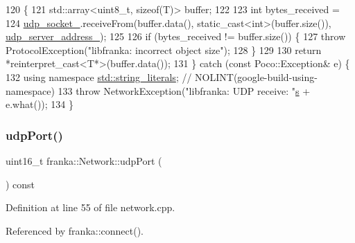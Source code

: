 \begin{DoxyCode}
120                                         \{
121   std::array<uint8\_t, sizeof(T)> buffer;
122 
123   \textcolor{keywordtype}{int} bytes\_received =
124       \hyperlink{classfranka_1_1Network_ac09fea0946977e7c366ad4a3421ef621}{udp\_socket\_}.receiveFrom(buffer.data(), \textcolor{keyword}{static\_cast<}\textcolor{keywordtype}{int}\textcolor{keyword}{>}(buffer.size()), 
      \hyperlink{classfranka_1_1Network_a5c87db65f0818d727b797e7da8d71334}{udp\_server\_address\_});
125 
126   \textcolor{keywordflow}{if} (bytes\_received != buffer.size()) \{
127     \textcolor{keywordflow}{throw} ProtocolException(\textcolor{stringliteral}{"libfranka: incorrect object size"});
128   \}
129 
130   \textcolor{keywordflow}{return} *\textcolor{keyword}{reinterpret\_cast<}T*\textcolor{keyword}{>}(buffer.data());
131 \} \textcolor{keywordflow}{catch} (\textcolor{keyword}{const} Poco::Exception& e) \{
132   \textcolor{keyword}{using namespace }\hyperlink{namespacestd_1_1string__literals}{std::string\_literals};  \textcolor{comment}{// NOLINT(google-build-using-namespace)}
133   \textcolor{keywordflow}{throw} NetworkException(\textcolor{stringliteral}{"libfranka: UDP receive: "}\hyperlink{namespaceservice__node__3_aa976421a49e0b54f23833423400849ae}{s} + e.what());
134 \}
\end{DoxyCode}
\mbox{\label{classfranka_1_1Network_ac3d85a9e79ef349dda41a6dfb0f0d49e}} 
\subsubsection{\texorpdfstring{udp\+Port()}{udpPort()}}
{\footnotesize\ttfamily uint16\+\_\+t franka\+::\+Network\+::udp\+Port (\begin{DoxyParamCaption}{ }\end{DoxyParamCaption}) const\hspace{0.3cm}{\ttfamily [noexcept]}}



Definition at line 55 of file network.\+cpp.



Referenced by franka\+::connect().


